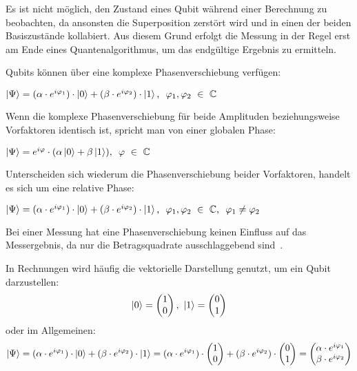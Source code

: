Es ist nicht möglich, 
den Zustand eines Qubit während einer Berechnung zu beobachten,
da ansonsten die Superposition zerstört wird und in einen der beiden Basiszustände kollabiert.
Aus diesem Grund erfolgt die Messung in der Regel erst am Ende eines Quantenalgorithmus, um das endgültige Ergebnis zu ermitteln.

\bigskip

Qubits können über eine komplexe Phasenverschiebung verfügen:
\begin{center}
  \(
    \ket{\Psi} = (\alpha \cdot e^{i\varphi_1}) \cdot \ket{0} + (\beta \cdot e^{i\varphi_2}) \cdot \ket{1}
    \text{, }~
    \varphi_1,\varphi_2~\in~\mathbb{C}
  \)
  \end{center}
Wenn die komplexe Phasenverschiebung für beide Amplituden beziehungsweise Vorfaktoren identisch ist, 
spricht man von einer globalen Phase:
\begin{center}
  \(
    \ket{\Psi} = e^{i\varphi} \cdot (\alpha \ket{0} + \beta  \ket{1} )
    \text{, }~
    \varphi~\in~\mathbb{C}
  \)
\end{center}
Unterscheiden sich wiederum die Phasenverschiebung beider Vorfaktoren, 
handelt es sich um eine relative Phase:
\begin{center}
  \(
    \ket{\Psi} = (\alpha \cdot e^{i\varphi_1}) \cdot \ket{0} + (\beta \cdot e^{i\varphi_2}) \cdot \ket{1}
    \text{, }~
    \varphi_1,\varphi_2~\in~\mathbb{C}
    \text{, }~
    \varphi_1 \neq \varphi_2
  \)
\end{center}
Bei einer Messung hat eine Phasenverschiebung keinen Einfluss auf das Messergebnis, 
da nur die Betragsquadrate ausschlaggebend sind~\cite{Hoever2023QC}. 

\bigskip

In Rechnungen wird häufig die vektorielle Darstellung genutzt, 
um ein Qubit darzustellen:
\[
  \ket{0} = 
  \begin{pmatrix}
    1 \\
    0
  \end{pmatrix},~ 
  \ket{1} = 
  \begin{pmatrix}
    0 \\
    1
  \end{pmatrix}
  \]
oder im Allgemeinen:
\[
  \ket{\Psi} 
  =
  (\alpha \cdot e^{i\varphi_1}) \cdot \ket{0} + (\beta \cdot e^{i\varphi_2}) \cdot \ket{1}
  =  
  (\alpha \cdot e^{i\varphi_1}) \cdot 
  \begin{pmatrix}
    1 \\
    0
  \end{pmatrix} + (\beta \cdot e^{i\varphi_2}) \cdot 
  \begin{pmatrix}
    0 \\
    1
  \end{pmatrix} 
  =
  \begin{pmatrix}
    \alpha \cdot e^{i\varphi_1} \\
    \beta \cdot e^{i\varphi_2}
  \end{pmatrix}
\] 

